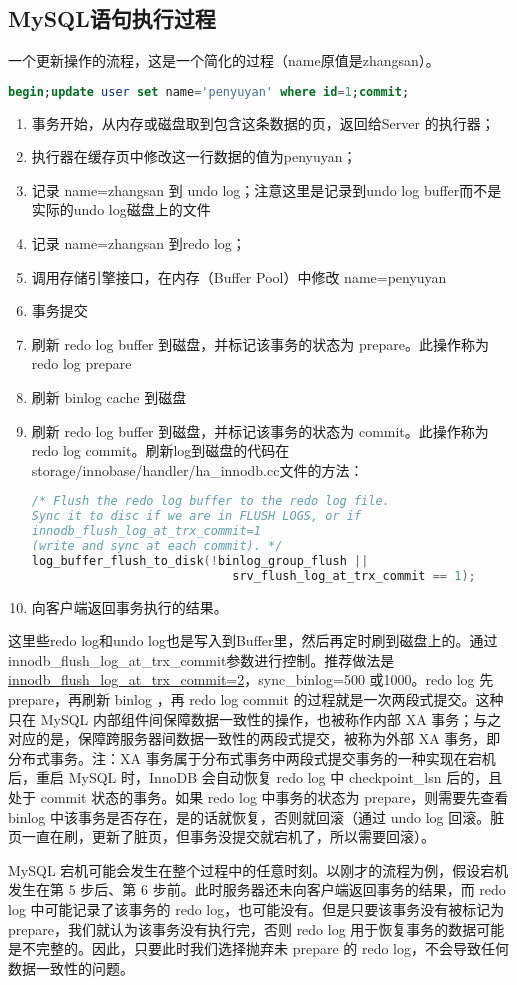 \documentclass[../../../interview-questions.tex]{subfiles}
\begin{document}
\subsection{MySQL语句执行过程}

一个更新操作的流程，这是一个简化的过程（name原值是zhangsan）。

\begin{lstlisting}[language=SQL]
begin;update user set name='penyuyan' where id=1;commit;
\end{lstlisting}

\begin{enumerate}
    \item {事务开始，从内存或磁盘取到包含这条数据的页，返回给Server 的执行器；}
    \item {执行器在缓存页中修改这一行数据的值为penyuyan；}
    \item {记录 name=zhangsan 到 undo log；注意这里是记录到undo log buffer而不是实际的undo log磁盘上的文件}
    \item {记录 name=zhangsan 到redo log；}
    \item {调用存储引擎接口，在内存（Buffer Pool）中修改 name=penyuyan}
    \item {事务提交}
    \item {刷新 redo log buffer 到磁盘，并标记该事务的状态为 prepare。此操作称为 redo log prepare}
    \item {刷新 binlog cache 到磁盘}
    \item {刷新 redo log buffer 到磁盘，并标记该事务的状态为 commit。此操作称为 redo log commit。}刷新log到磁盘的代码在storage/innobase/handler/ha\_innodb.cc文件的方法：
    
\begin{lstlisting}[language=C]
/* Flush the redo log buffer to the redo log file.
Sync it to disc if we are in FLUSH LOGS, or if
innodb_flush_log_at_trx_commit=1
(write and sync at each commit). */
log_buffer_flush_to_disk(!binlog_group_flush ||
                            srv_flush_log_at_trx_commit == 1);
\end{lstlisting}


    \item {向客户端返回事务执行的结果。}
\end{enumerate}

这里些redo log和undo log也是写入到Buffer里，然后再定时刷到磁盘上的。通过innodb\_flush\_log\_at\_trx\_commit参数进行控制。推荐做法是\url{innodb\_flush\_log\_at\_trx\_commit=2}，sync\_binlog=500 或1000。redo log 先 prepare，再刷新 binlog ，再 redo log commit 的过程就是一次两段式提交。这种只在 MySQL 内部组件间保障数据一致性的操作，也被称作内部 XA 事务；与之对应的是，保障跨服务器间数据一致性的两段式提交，被称为外部 XA 事务，即分布式事务。注：XA 事务属于分布式事务中两段式提交事务的一种实现在宕机后，重启 MySQL 时，InnoDB 会自动恢复 redo log 中 checkpoint\_lsn 后的，且处于 commit 状态的事务。如果 redo log 中事务的状态为 prepare，则需要先查看 binlog 中该事务是否存在，是的话就恢复，否则就回滚（通过 undo log 回滚。脏页一直在刷，更新了脏页，但事务没提交就宕机了，所以需要回滚）。

MySQL 宕机可能会发生在整个过程中的任意时刻。以刚才的流程为例，假设宕机发生在第 5 步后、第 6 步前。此时服务器还未向客户端返回事务的结果，而 redo log 中可能记录了该事务的 redo log，也可能没有。但是只要该事务没有被标记为 prepare，我们就认为该事务没有执行完，否则 redo log 用于恢复事务的数据可能是不完整的。因此，只要此时我们选择抛弃未 prepare 的 redo log，不会导致任何数据一致性的问题。
\end{document}

